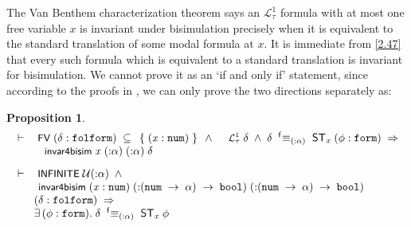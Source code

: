 \documentclass{llncs}
\newtheorem{prop}[thm]{Proposition}
\newenvironment{holmath}{\begin{displaymath}\begin{array}{l}}{\end{array}\end{displaymath}\ignorespacesafterend}
\renewcommand{\HOLConst}[1]{{\textsf{\upshape\small #1}}}
\begin{document}
The Van Benthem characterization theorem says an $\mathcal L_{\tau}^1$ formula with at most one free variable $x$ is invariant under bisimulation precisely when it is equivalent to the standard translation of some modal formula at $x$. It is immediate from \ref{2.47} that every such formula which is equivalent to a standard translation is invariant for bisimulation. We cannot prove it as an `if and only if' statement, since according to the proofs in \cite{Blackburn}, we can only prove the two directions separately as:
\begin{prop}
{\upshape\cite[Theorem 2.68, as two separate directions]{Blackburn}}
\begin{holmath}
  \ensuremath{\HOLTokenTurnstile}\HOLConst{FV}\;(\HOLFreeVar{\ensuremath{\delta}} :\HOLTyOp{folform})\;\HOLSymConst{\HOLTokenSubset{}}\;\HOLTokenLeftbrace{}(\HOLFreeVar{x} :\HOLTyOp{num})\HOLTokenRightbrace{}\;\HOLSymConst{\HOLTokenConj{}}\;\HOLConst{\ensuremath{{\mathcal L}^1_\tau}}\;\HOLFreeVar{\ensuremath{\delta}}\;\HOLSymConst{\HOLTokenConj{}}\;\HOLFreeVar{\ensuremath{\delta}}\;\;{}\sp{\sf f}{\equiv}\sb{({:}\ensuremath{\alpha})}\;\;{\sf ST}\sb{\HOLFreeVar{x}}\;(\HOLFreeVar{\ensuremath{\phi}} :\HOLTyOp{form})\;\HOLSymConst{\HOLTokenImp{}}\\
\;\;\;\;\;\;\;\HOLConst{invar4bisim}\;\HOLFreeVar{x}\;({:}\ensuremath{\alpha})\;({:}\ensuremath{\alpha})\;\HOLFreeVar{\ensuremath{\delta}} \\[3mm]
 \ensuremath{\HOLTokenTurnstile}\HOLConst{INFINITE}\;\ensuremath{{\cal{U}}}({:}\ensuremath{\alpha})\;\HOLSymConst{\HOLTokenConj{}}\\
\;\;\;\;\;\HOLConst{invar4bisim}\;(\HOLFreeVar{x} :\HOLTyOp{num})\;({:}(\HOLTyOp{num}\;\ensuremath{\rightarrow}\;\ensuremath{\alpha})\;\ensuremath{\rightarrow}\;\HOLTyOp{bool})\;({:}(\HOLTyOp{num}\;\ensuremath{\rightarrow}\;\ensuremath{\alpha})\;\ensuremath{\rightarrow}\;\HOLTyOp{bool})\\
\;\;\;\;\;\;\;(\HOLFreeVar{\ensuremath{\delta}} :\HOLTyOp{folform})\;\HOLSymConst{\HOLTokenImp{}}\\
\;\;\;\;\;\;\;\HOLSymConst{\HOLTokenExists{}}(\HOLBoundVar{\ensuremath{\phi}} :\HOLTyOp{form}).\;\HOLFreeVar{\ensuremath{\delta}}\;\;{}\sp{\sf f}{\equiv}\sb{({:}\ensuremath{\alpha})}\;\;{\sf ST}\sb{\HOLFreeVar{x}}\;\HOLBoundVar{\ensuremath{\phi}}
\end{holmath}
\end{prop}
\end{document}
